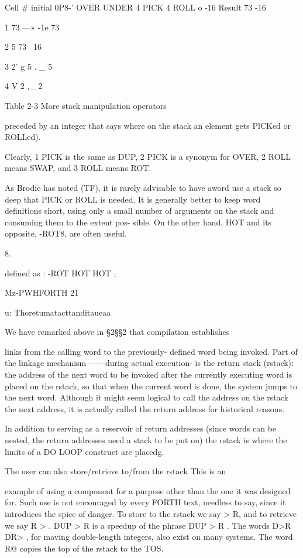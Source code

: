  

 

Cell # initial 0P8-' OVER UNDER 4 PICK 4 ROLL
o -16 Result 73 -16

1 73 —» -1e 73

2 5 73 ~16

3 2' g 5 . _ 5

4 V 2 ,_ 2

 

 

 

Table 2-3 More stack manipulation operators

preceded by an integer that says where on the stack an element
gets PlCKed or ROLLed).

Clearly, 1 PICK is the same as DUP, 2 PICK is a synonym for
OVER, 2 ROLL means SWAP, and 3 ROLL means ROT.

As Brodie has noted (TF), it is rarely advisable to have aword use
a stack so deep that PICK or ROLL is needed. It is generally better
to keep word deﬁnitions short, using only a small number of
arguments on the stack and consuming them to the extent pos-
sible. On the other hand, HOT and its opposite, -ROT8, are often
useful.

 

8.

deﬁned as : -ROT HOT HOT ;

Mz-PWHFORTH 21

u: Thoretumatacttanditaueaa

We have remarked above in §2§§2 that compilation establishes

links from the calling word to the previously- deﬁned word
being invoked. Part of the linkage mechanism ——during actual
execution- is the return stack (rstack): the address of the next
word to be invoked after the currently executing word is placed
on the rstack, so that when the current word is done, the system
jumps to the next word. Although it might seem logical to call the
address on the rstack the next address, it is actually called the
return address for historical reasons.

In addition to serving as a reservoir of return addresses (since
words can be nested, the return addresses need a stack to be put
on) the rstack is where the limits of a DO LOOP construct are
placedg.

The user can also store/retrieve to/from the rstack This is an

example of using a component for a purpose other than the
one it was designed for. Such use is not encouraged by every
FORTH text, needless to say, since it introduces the spice of
danger. To store to the rstack we say > R, and to retrieve we say
R > . DUP > R is a speedup of the phrase DUP > R . The words
D>R DR> , for maving double-length integers, also exist on
many systems. The word R@ copies the top of the rstack to the
TOS.

